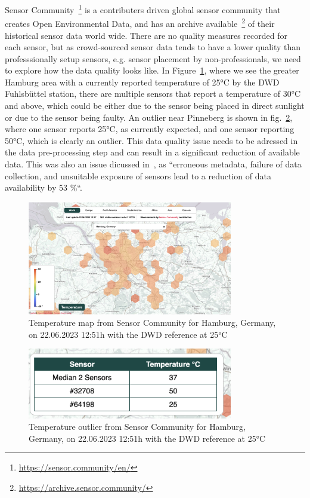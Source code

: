 Sensor Community~\footnote{\url{https://sensor.community/en/}} is a contributers driven global sensor community that creates Open Environmental Data, and has an archive available~\footnote{\url{https://archive.sensor.community/}} of their historical sensor data world wide. There are no quality measures recorded for each sensor, but as crowd-sourced sensor data tends to have a lower quality than professsionally setup sensors, e.g. sensor placement by non-professionals, we need to explore how the data quality looks like.
In Figure~\ref{fig:temperature_sensor_community_map}, where we see the greater Hamburg area with a currently reported temperature of 25°C by the DWD Fuhlsbüttel station, there are multiple sensors that report a temperature of 30°C and above, which could be either due to the sensor being placed in direct sunlight or due to the sensor being faulty. An outlier near Pinneberg is shown in fig.~\ref{fig:temperature_sensor_community_outlier}, where one sensor reports 25°C, as currently expected, and one sensor reporting 50°C, which is clearly an outlier. This data quality issue needs to be adressed in the data pre-processing step and can result in a significant reduction of available data. This was also an issue dicussed in~\cite{meier2017crowdsourcing}, as ``erroneous metadata, failure of data collection, and unsuitable exposure of sensors lead to a reduction of data availability by 53 \%``.

\begin{figure}[ht]
    \centering
    \includegraphics[width=0.8\textwidth]{images/sensor_community_temperature_map.png}
    \caption{Temperature map from Sensor Community for Hamburg, Germany, on 22.06.2023 12:51h with the DWD reference at 25°C}
    \label{fig:temperature_sensor_community_map}
\end{figure}

\begin{figure}[ht]
    \centering
    \includegraphics[width=0.8\textwidth]{images/sensor_community_outliers.png}
    \caption{Temperature outlier from Sensor Community for Hamburg, Germany, on 22.06.2023 12:51h with the DWD reference at 25°C}
    \label{fig:temperature_sensor_community_outlier}
\end{figure}

